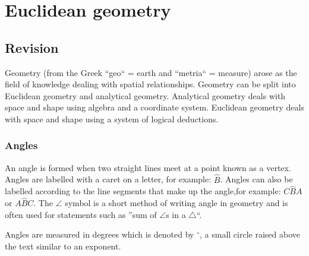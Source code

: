\chapter{Euclidean geometry}
\setcounter{figure}{1}
\setcounter{subfigure}{1}
\section {Revision}
\setcounter{figure}{1}
\setcounter{subfigure}{1}

Geometry (from the Greek ``geo`` = earth and ``metria`` = measure) arose as the field of knowledge
dealing with spatial relationships. Geometry can be split into Euclidean geometry and analytical geometry. 
Analytical geometry deals with space and shape using algebra and a coordinate system. 
Euclidean geometry deals with space and shape using a system of logical deductions.\par 
{}
\subsection*{Angles}
An angle is formed when two straight lines meet at a point known as a vertex. 
Angles are labelled with a caret on a letter, for example: $\hat{B}$.
Angles can also be labelled according to the line segments that make up the
angle,for example: $C\hat{B}A$ or $A\hat{B}C$. 
The $\angle $ symbol is a short method of writing angle in
geometry and is often used for statements such as ''sum of $\angle$s in a $\triangle$``.\par 
Angles are measured in degrees which is denoted by $^{\circ }$, a small circle
raised above the text similar to an exponent.\par 



